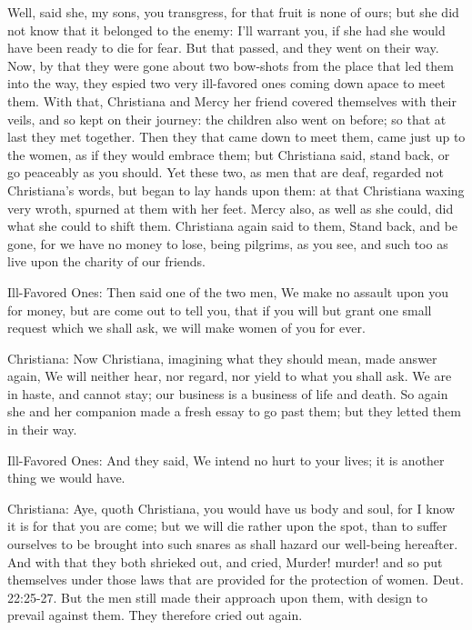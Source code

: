 Well, said she, my sons, you transgress, for that fruit is none of ours; but she did not know that it belonged to the enemy: I'll warrant you, if she had she would have been ready to die for fear. But that passed, and they went on their way. Now, by that they were gone about two bow-shots from the place that led them into the way, they espied two very ill-favored ones coming down apace to meet them. With that, Christiana and Mercy her friend covered themselves with their veils, and so kept on their journey: the children also went on before; so that at last they met together. Then they that came down to meet them, came just up to the women, as if they would embrace them; but Christiana said, stand back, or go peaceably as you should. Yet these two, as men that are deaf, regarded not Christiana's words, but began to lay hands upon them: at that Christiana waxing very wroth, spurned at them with her feet. Mercy also, as well as she could, did what she could to shift them. Christiana again said to them, Stand back, and be gone, for we have no money to lose, being pilgrims, as you see, and such too as live upon the charity of our friends.

Ill-Favored Ones: Then said one of the two men, We make no assault upon you for money, but are come out to tell you, that if you will but grant one small request which we shall ask, we will make women of you for ever.

Christiana: Now Christiana, imagining what they should mean, made answer again, We will neither hear, nor regard, nor yield to what you shall ask. We are in haste, and cannot stay; our business is a business of life and death. So again she and her companion made a fresh essay to go past them; but they letted them in their way.

Ill-Favored Ones: And they said, We intend no hurt to your lives; it is another thing we would have.

Christiana: Aye, quoth Christiana, you would have us body and soul, for I know it is for that you are come; but we will die rather upon the spot, than to suffer ourselves to be brought into such snares as shall hazard our well-being hereafter. And with that they both shrieked out, and cried, Murder! murder! and so put themselves under those laws that are provided for the protection of women. Deut. 22:25-27. But the men still made their approach upon them, with design to prevail against them. They therefore cried out again.

